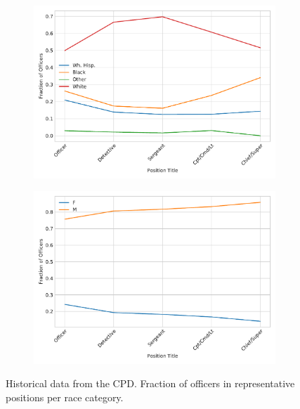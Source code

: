 \begin{figure}[h] 
\begin{subfigure}{0.45\textwidth}
\includegraphics[width=\textwidth]{figs/position_race} 
\end{subfigure}
\begin{subfigure}{0.45\textwidth}
\includegraphics[width=\textwidth]{figs/position_gender} 
\end{subfigure}
\caption{Historical data from the CPD. Fraction of officers in representative positions 
per race category.} \label{fig:position}
\end{figure}



